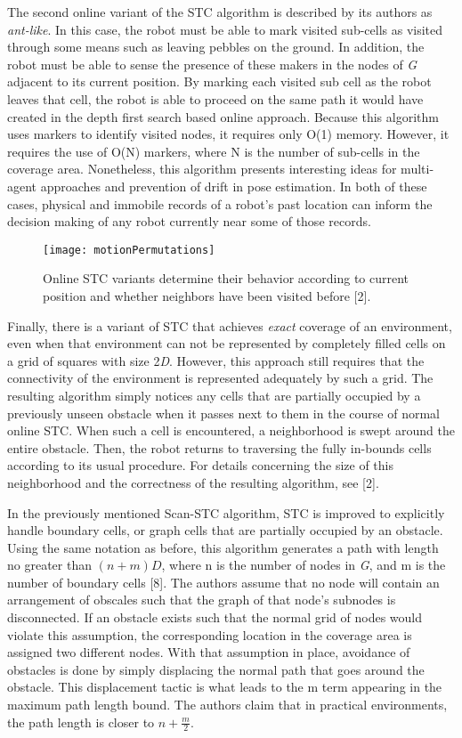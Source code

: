 The second online variant of the STC algorithm is described by its authors as \textit{ant-like}. In this case, the robot must be able to mark visited sub-cells as visited through some means such as leaving pebbles on the ground. In addition, the robot must be able to sense the presence of these makers in the nodes of \textit{G} adjacent to its current position. By marking each visited sub cell as the robot leaves that cell, the robot is able to proceed on the same path it would have created in the depth first search based online approach. Because this algorithm uses markers to identify visited nodes, it requires only O(1) memory. However, it requires the use of O(N) markers, where N is the number of sub-cells in the coverage area. Nonetheless, this algorithm presents interesting ideas for multi-agent approaches and prevention of drift in pose estimation. In both of these cases, physical and immobile records of a robot's past location can inform the decision making of any robot currently near some of those records.

\begin{figure}[H]
\texttt{[image: motionPermutations]}
\caption[Neighbor Visiting Behavior for Online STC]{Online STC variants determine their behavior according to current position and whether neighbors have been visited before [2].}
\end{figure}

Finally, there is a variant of STC that achieves \textit{exact} coverage of an environment, even when that environment can not be represented by completely filled cells on a grid of squares with size 2\textit{D}. However, this approach still requires that the connectivity of the environment is represented adequately by such a grid. The resulting algorithm simply notices any cells that are partially occupied by a previously unseen obstacle when it passes next to them in the course of normal online STC. When such a cell is encountered, a neighborhood is swept around the entire obstacle. Then, the robot returns to traversing the fully in-bounds cells according to its usual procedure. For details concerning the size of this neighborhood and the correctness of the resulting algorithm, see [2].

In the previously mentioned Scan-STC algorithm, STC is improved to explicitly handle boundary cells, or graph cells that are partially occupied by an obstacle. Using the same notation as before, this algorithm generates a path with length no greater than $ (n + m)\textit{D} $, where n is the number of nodes in \textit{G}, and m is the number of boundary cells [8]. The authors assume that no node will contain an arrangement of obscales such that the graph of that node's subnodes is disconnected. If an obstacle exists such that the normal grid of nodes would violate this assumption, the corresponding location in the coverage area is assigned two different nodes. With that assumption in place, avoidance of obstacles is done by simply displacing the normal path that goes around the obstacle. This displacement tactic is what leads to the m term appearing in the maximum path length bound. The authors claim that in practical environments, the path length is closer to $ n + \frac{m}{2} $.

